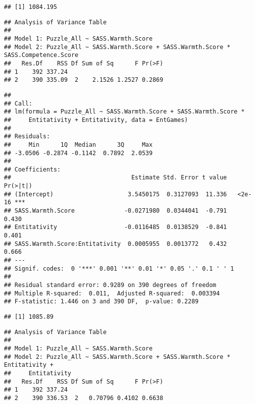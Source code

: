 \documentclass[
  doc,draftall]{apa6}
\begin{document}
\begin{verbatim}
## [1] 1084.195
\end{verbatim}

\begin{verbatim}
## Analysis of Variance Table
## 
## Model 1: Puzzle_All ~ SASS.Warmth.Score
## Model 2: Puzzle_All ~ SASS.Warmth.Score + SASS.Warmth.Score * SASS.Competence.Score
##   Res.Df    RSS Df Sum of Sq      F Pr(>F)
## 1    392 337.24                           
## 2    390 335.09  2    2.1526 1.2527 0.2869
\end{verbatim}

\begin{verbatim}
## 
## Call:
## lm(formula = Puzzle_All ~ SASS.Warmth.Score + SASS.Warmth.Score * 
##     Entitativity + Entitativity, data = EntGames)
## 
## Residuals:
##     Min      1Q  Median      3Q     Max 
## -3.0506 -0.2874 -0.1142  0.7892  2.0539 
## 
## Coefficients:
##                                  Estimate Std. Error t value Pr(>|t|)    
## (Intercept)                     3.5450175  0.3127093  11.336   <2e-16 ***
## SASS.Warmth.Score              -0.0271980  0.0344041  -0.791    0.430    
## Entitativity                   -0.0116485  0.0138529  -0.841    0.401    
## SASS.Warmth.Score:Entitativity  0.0005955  0.0013772   0.432    0.666    
## ---
## Signif. codes:  0 '***' 0.001 '**' 0.01 '*' 0.05 '.' 0.1 ' ' 1
## 
## Residual standard error: 0.9289 on 390 degrees of freedom
## Multiple R-squared:  0.011,  Adjusted R-squared:  0.003394 
## F-statistic: 1.446 on 3 and 390 DF,  p-value: 0.2289
\end{verbatim}

\begin{verbatim}
## [1] 1085.89
\end{verbatim}

\begin{verbatim}
## Analysis of Variance Table
## 
## Model 1: Puzzle_All ~ SASS.Warmth.Score
## Model 2: Puzzle_All ~ SASS.Warmth.Score + SASS.Warmth.Score * Entitativity + 
##     Entitativity
##   Res.Df    RSS Df Sum of Sq      F Pr(>F)
## 1    392 337.24                           
## 2    390 336.53  2   0.70796 0.4102 0.6638
\end{verbatim}
\end{document}
